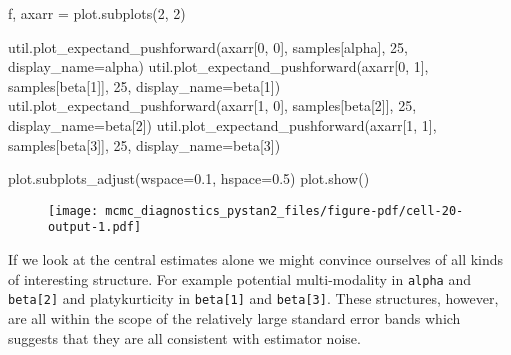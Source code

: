 \documentclass[
  letterpaper,
  DIV=11,
  numbers=noendperiod]{scrartcl}
\newenvironment{Shaded}{\begin{snugshade}}{\end{snugshade}}
\newcommand{\DecValTok}[1]{\textcolor[rgb]{0.68,0.00,0.00}{#1}}
\newcommand{\FloatTok}[1]{\textcolor[rgb]{0.68,0.00,0.00}{#1}}
\newcommand{\NormalTok}[1]{\textcolor[rgb]{0.00,0.23,0.31}{#1}}
\newcommand{\OperatorTok}[1]{\textcolor[rgb]{0.37,0.37,0.37}{#1}}
\newcommand{\StringTok}[1]{\textcolor[rgb]{0.13,0.47,0.30}{#1}}
\begin{document}
\begin{Shaded}
\begin{Highlighting}[]
\NormalTok{f, axarr }\OperatorTok{=}\NormalTok{ plot.subplots(}\DecValTok{2}\NormalTok{, }\DecValTok{2}\NormalTok{)}

\NormalTok{util.plot\_expectand\_pushforward(axarr[}\DecValTok{0}\NormalTok{, }\DecValTok{0}\NormalTok{], samples[}\StringTok{\textquotesingle{}alpha\textquotesingle{}}\NormalTok{], }
                                \DecValTok{25}\NormalTok{, display\_name}\OperatorTok{=}\StringTok{\textquotesingle{}alpha\textquotesingle{}}\NormalTok{)}
\NormalTok{util.plot\_expectand\_pushforward(axarr[}\DecValTok{0}\NormalTok{, }\DecValTok{1}\NormalTok{], samples[}\StringTok{\textquotesingle{}beta[1]\textquotesingle{}}\NormalTok{], }
                                \DecValTok{25}\NormalTok{, display\_name}\OperatorTok{=}\StringTok{\textquotesingle{}beta[1]\textquotesingle{}}\NormalTok{)}
\NormalTok{util.plot\_expectand\_pushforward(axarr[}\DecValTok{1}\NormalTok{, }\DecValTok{0}\NormalTok{], samples[}\StringTok{\textquotesingle{}beta[2]\textquotesingle{}}\NormalTok{], }
                                \DecValTok{25}\NormalTok{, display\_name}\OperatorTok{=}\StringTok{\textquotesingle{}beta[2]\textquotesingle{}}\NormalTok{)}
\NormalTok{util.plot\_expectand\_pushforward(axarr[}\DecValTok{1}\NormalTok{, }\DecValTok{1}\NormalTok{], samples[}\StringTok{\textquotesingle{}beta[3]\textquotesingle{}}\NormalTok{], }
                                \DecValTok{25}\NormalTok{, display\_name}\OperatorTok{=}\StringTok{\textquotesingle{}beta[3]\textquotesingle{}}\NormalTok{)}

\NormalTok{plot.subplots\_adjust(wspace}\OperatorTok{=}\FloatTok{0.1}\NormalTok{, hspace}\OperatorTok{=}\FloatTok{0.5}\NormalTok{)}
\NormalTok{plot.show()}
\end{Highlighting}
\end{Shaded}

\begin{figure}[H]

{\centering \texttt{[image: mcmc\_diagnostics\_pystan2\_files/figure-pdf/cell-20-output-1.pdf]}

}

\end{figure}

If we look at the central estimates alone we might convince ourselves of
all kinds of interesting structure. For example potential multi-modality
in \texttt{alpha} and \texttt{beta{[}2{]}} and platykurticity in
\texttt{beta{[}1{]}} and \texttt{beta{[}3{]}}. These structures,
however, are all within the scope of the relatively large standard error
bands which suggests that they are all consistent with estimator noise.
\end{document}
